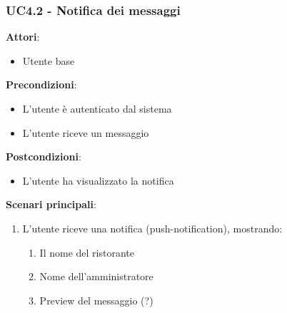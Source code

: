 \subsubsection{UC4.2 - Notifica dei messaggi}\label{usecase:4_2}
\textbf{Attori}:
\begin{itemize}
    \item Utente base
\end{itemize}
\textbf{Precondizioni}:
\begin{itemize}
    \item L'utente è autenticato dal sistema
    \item L'utente riceve un messaggio
\end{itemize}
\textbf{Postcondizioni}:
\begin{itemize}
    \item L'utente ha visualizzato la notifica
\end{itemize}
\textbf{Scenari principali}:
\begin{enumerate}
    \item L'utente riceve una notifica (push-notification), mostrando:
    \begin{enumerate}
        \item Il nome del ristorante
        \item Nome dell'amministratore
        \item Preview del messaggio (?)
    \end{enumerate}
\end{enumerate}
\newpage